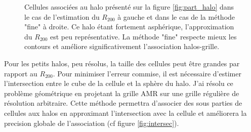 \begin{figure}
    \caption[Méthodes d'association matière noire - grille]{Cellules associées au halo présenté sur la figure \ref{fig:part_halo} dans le cas de l'estimation du $R_{200}$ à gauche et dans le cas de la méthode "fine" à droite.
    Ce halo étant fortement asphérique, l'approximation du $R_{200}$ est peu représentative.
    La méthode "fine" respecte mieux les contours et améliore significativement l'association halos-grille.
 	\label{fig:R200_fine}}
\end{figure}


Pour les petits halos, peu résolus, la taille des cellules peut être grandes par rapport au $R_{200}$.
Pour minimiser l'erreur commise, il est nécessaire d’estimer l'intersection entre le cube de la cellule et la sphère du halo.
J'ai résolu ce problème géométrique en projetant la grille \ac{AMR} sur une grille régulière de résolution arbitraire.
Cette méthode permettra d'associer des sous parties de cellules aux halos en approximant l'intersection avec la cellule et améliorera la precision globale de l'association (cf figure \ref{fig:intersec}).

